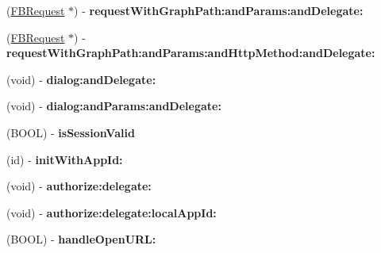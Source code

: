 \begin{DoxyCompactItemize}
\item 
\hypertarget{interface_facebook_a01d3d35b70775982c37d68a53b911438}{
(\hyperlink{interface_f_b_request}{\-F\-B\-Request} $\ast$) -\/ {\bfseries request\-With\-Graph\-Path\-:and\-Params\-:and\-Delegate\-:}}
\label{interface_facebook_a01d3d35b70775982c37d68a53b911438}

\item 
\hypertarget{interface_facebook_a735024bca08b871be8fb5a7660ed56b5}{
(\hyperlink{interface_f_b_request}{\-F\-B\-Request} $\ast$) -\/ {\bfseries request\-With\-Graph\-Path\-:and\-Params\-:and\-Http\-Method\-:and\-Delegate\-:}}
\label{interface_facebook_a735024bca08b871be8fb5a7660ed56b5}

\item 
\hypertarget{interface_facebook_afb28ba8c9088bea131e780cbf7a34839}{
(void) -\/ {\bfseries dialog\-:and\-Delegate\-:}}
\label{interface_facebook_afb28ba8c9088bea131e780cbf7a34839}

\item 
\hypertarget{interface_facebook_a1912857d2083d698ee82dfe17346e6a4}{
(void) -\/ {\bfseries dialog\-:and\-Params\-:and\-Delegate\-:}}
\label{interface_facebook_a1912857d2083d698ee82dfe17346e6a4}

\item 
\hypertarget{interface_facebook_a6178476bc78da9727d4f2b32b9663a9a}{
(\-B\-O\-O\-L) -\/ {\bfseries is\-Session\-Valid}}
\label{interface_facebook_a6178476bc78da9727d4f2b32b9663a9a}

\item 
\hypertarget{interface_facebook_aa85460ff62b6bf81946548b7983b931d}{
(id) -\/ {\bfseries init\-With\-App\-Id\-:}}
\label{interface_facebook_aa85460ff62b6bf81946548b7983b931d}

\item 
\hypertarget{interface_facebook_ae8e4829a8dbf6270c1fa9ee66726560c}{
(void) -\/ {\bfseries authorize\-:delegate\-:}}
\label{interface_facebook_ae8e4829a8dbf6270c1fa9ee66726560c}

\item 
\hypertarget{interface_facebook_a6f8b7a7d0999024180dcdee71dba1dfe}{
(void) -\/ {\bfseries authorize\-:delegate\-:local\-App\-Id\-:}}
\label{interface_facebook_a6f8b7a7d0999024180dcdee71dba1dfe}

\item 
\hypertarget{interface_facebook_af59e46399f97cdb3f7f235822a30f06f}{
(\-B\-O\-O\-L) -\/ {\bfseries handle\-Open\-U\-R\-L\-:}}
\label{interface_facebook_af59e46399f97cdb3f7f235822a30f06f}


\end{DoxyCompactItemize}
